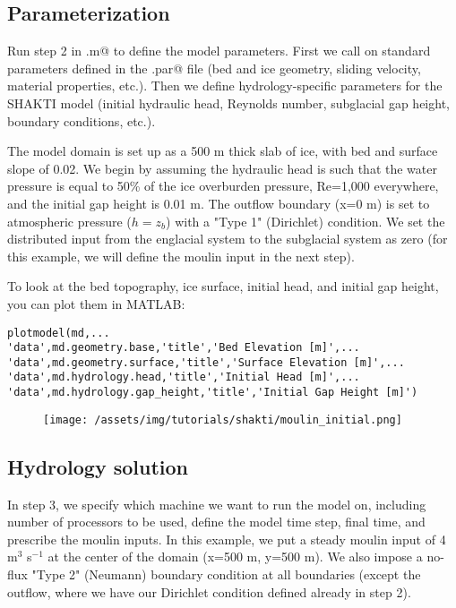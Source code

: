 \subsection{Parameterization}
Run step 2 in \verb@runme.m@ to define the model parameters. First we call on standard parameters defined in the \verb@moulin.par@ file (bed and ice geometry, sliding velocity, material properties, etc.). Then we define hydrology-specific parameters for the SHAKTI model (initial hydraulic head, Reynolds number, subglacial gap height, boundary conditions, etc.).

The model domain is set up as a 500 m thick slab of ice, with bed and surface slope of 0.02. We begin by assuming the hydraulic head is such that the water pressure is equal to 50\% of the ice overburden pressure, Re=1,000 everywhere, and the initial gap height is 0.01 m. The outflow boundary (x=0 m) is set to atmospheric pressure ($h=z_b$) with a "Type 1" (Dirichlet) condition. We set the distributed input from the englacial system to the subglacial system as zero (for this example, we will define the moulin input in the next step).

To look at the bed topography, ice surface, initial head, and initial gap height, you can plot them in MATLAB:

\begin{verbatim}plotmodel(md,...
'data',md.geometry.base,'title','Bed Elevation [m]',...
'data',md.geometry.surface,'title','Surface Elevation [m]',...
'data',md.hydrology.head,'title','Initial Head [m]',...
'data',md.hydrology.gap_height,'title','Initial Gap Height [m]')\end{verbatim}

\begin{figure}[H]
	\begin{center}
		\texttt{[image: /assets/img/tutorials/shakti/moulin\_initial.png]}
	\end{center}
\end{figure}

\subsection{Hydrology solution}
In step 3, we specify which machine we want to run the model on, including number of processors to be used, define the model time step, final time, and prescribe the moulin inputs. In this example, we put a steady moulin input of 4 m$^3$ s$^{-1}$ at the center of the domain (x=500 m, y=500 m). We also impose a no-flux "Type 2" (Neumann) boundary condition at all boundaries (except the outflow, where we have our Dirichlet condition defined already in step 2).

